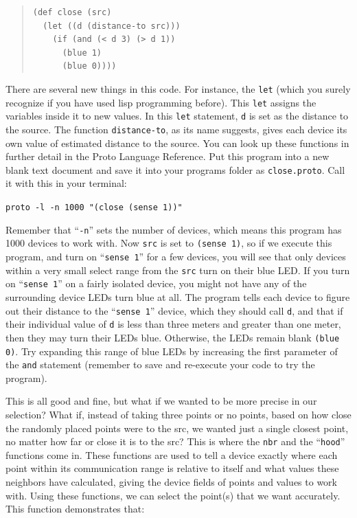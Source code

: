 \documentclass{article}
\newcommand\code[1]{\begin{center}\var{#1}\end{center}}
\newcommand\var[1]{{\tt #1}}
\newcommand\qvar[1]{``{\tt #1}''}
\begin{document}
\begin{quote}
\begin{verbatim}
(def close (src) 
  (let ((d (distance-to src)))
    (if (and (< d 3) (> d 1)) 
      (blue 1) 
      (blue 0))))
\end{verbatim}
\end{quote}

There are several new things in this code. For instance, the \var{let}
(which you surely recognize if you have used lisp programming before).
This \var{let} assigns the variables inside it to new values.  In this
\var{let} statement, \var{d} is set as the distance to the source.
The function \var{distance-to}, as its name suggests, gives each
device its own value of estimated distance to the source.  You can
look up these functions in further detail in the Proto Language
Reference.  Put this program into a new blank text document and save
it into your programs folder as \var{close.proto}. Call it with this
in your terminal:

\code{proto -l -n 1000 "(close (sense 1))"}

Remember that \qvar{-n} sets the number of devices, which means this
program has 1000 devices to work with. Now \var{src} is set to
\var{(sense 1)}, so if we execute this program, and turn on
\qvar{sense 1} for a few devices, you will see that only devices
within a very small select range from the \var{src} turn on their blue
LED.  If you turn on \qvar{sense 1} on a fairly isolated device, you
might not have any of the surrounding device LEDs turn blue at all.
The program tells each device to figure out their distance to the
\qvar{sense 1} device, which they should call \var{d}, and that if
their individual value of \var{d} is less than three meters and
greater than one meter, then they may turn their LEDs blue.
Otherwise, the LEDs remain blank \var{(blue 0)}.  Try expanding this
range of blue LEDs by increasing the first parameter of the \var{and}
statement (remember to save and re-execute your code to try the
program).

This is all good and fine, but what if we wanted to be more precise in
our selection?  What if, instead of taking three points or no points,
based on how close the randomly placed points were to the src, we
wanted just a single closest point, no matter how far or close it is
to the src?  This is where the \var{nbr} and the \qvar{hood} functions
come in.  These functions are used to tell a device exactly where each
point within its communication range is relative to itself and what
values these neighbors have calculated, giving the device fields of
points and values to work with. Using these functions, we can select
the point(s) that we want accurately. This function demonstrates that:
\end{document}
